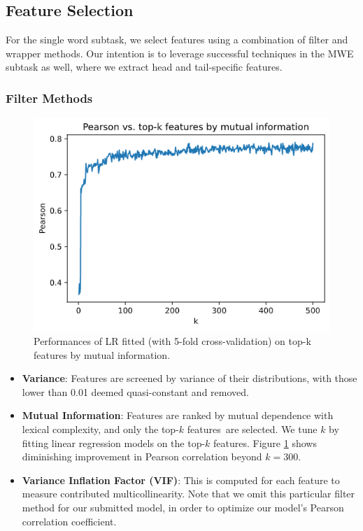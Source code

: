 \documentclass{dcthesis}
\theoremstyle{definition}
\theoremstyle{remark}
\begin{document}
\subsection{Feature Selection}

For the single word subtask, we select features using a combination of filter and wrapper methods. Our intention is to leverage successful techniques in the MWE subtask as well, where we extract head and tail-specific features.

\subsubsection{Filter Methods}

\begin{figure}
  \centering
  \includegraphics[scale=0.75]{mi.png}
  \caption{\label{fig:mi} Performances of LR fitted (with 5-fold cross-validation) on top-k features by mutual information.}
\end{figure}

\begin{itemize}
  \item \textbf{Variance}: Features are screened by variance of their distributions, with those lower than 0.01 deemed quasi-constant and removed.
  \item \textbf{Mutual Information}: Features are ranked by mutual dependence with lexical complexity, and only the top-$k$ features are selected. We tune $k$ by fitting linear regression models on the top-$k$ features. Figure \ref{fig:mi} shows diminishing improvement in Pearson correlation beyond $k=300$.
  \item \textbf{Variance Inflation Factor (VIF)}: This is computed for each feature to measure contributed multicollinearity. Note that we omit this particular filter method for our submitted model, in order to optimize our model's Pearson correlation coefficient.
\end{itemize}
\end{document}
